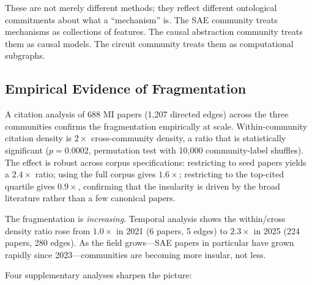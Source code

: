 \documentclass{article}
\begin{document}
These are not merely different methods; they reflect different ontological commitments about what a ``mechanism'' is. The SAE community treats mechanisms as collections of features. The causal abstraction community treats them as causal models. The circuit community treats them as computational subgraphs.

\subsection{Empirical Evidence of Fragmentation}

A citation analysis of 688 MI papers (1,207 directed edges) across the three communities confirms the fragmentation empirically at scale. Within-community citation density is $2{\times}$ cross-community density, a ratio that is statistically significant ($p = 0.0002$, permutation test with 10,000 community-label shuffles). The effect is robust across corpus specifications: restricting to seed papers yields a $2.4{\times}$ ratio; using the full corpus gives $1.6{\times}$; restricting to the top-cited quartile gives $0.9{\times}$, confirming that the insularity is driven by the broad literature rather than a few canonical papers.

The fragmentation is \emph{increasing}. Temporal analysis shows the within/cross density ratio rose from $1.0{\times}$ in 2021 (6 papers, 5 edges) to $2.3{\times}$ in 2025 (224 papers, 280 edges). As the field grows---SAE papers in particular have grown rapidly since 2023---communities are becoming more insular, not less.

Four supplementary analyses sharpen the picture:
\end{document}
